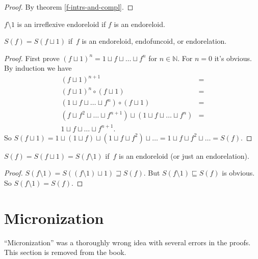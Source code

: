 \begin{proof}
By theorem \ref{f-intrs-and-compl}.
\end{proof}

\begin{obvious}
$f \setminus 1$ is an irreflexive endoreloid if $f$ is an endoreloid.
\end{obvious}

\begin{prop}
$S (f) = S (f \sqcup 1)$ if~$f$ is an endoreloid,
endofuncoid, or endorelation.
\end{prop}

\begin{proof}
First prove $(f \sqcup 1)^n = 1 \sqcup f \sqcup \ldots \sqcup f^n$ for $n \in
\mathbb{N}$. For $n = 0$ it's obvious. By induction we have
\begin{align*}
(f\sqcup 1)^{n+1} &= \\
(f\sqcup 1)^n\circ(f\sqcup 1) &= \\
(1\sqcup f\sqcup\dots\sqcup f^n)\circ(f\sqcup 1) &= \\
(f\sqcup f^2\sqcup\dots\sqcup f^{n+1}) \sqcup (1\sqcup f\sqcup\dots\sqcup f^n) &= \\
1\sqcup f\sqcup\dots\sqcup f^{n+1}.
\end{align*}
So $S (f \sqcup 1) = 1 \sqcup (1 \sqcup f) \sqcup (1 \sqcup f \sqcup f^2) \sqcup
\ldots = 1 \sqcup f \sqcup f^2 \sqcup \ldots = S (f)$.
\end{proof}

\begin{cor}
$S (f) = S (f \sqcup 1) = S (f \setminus 1)$ if~$f$ is an endoreloid
(or just an endorelation).
\end{cor}

\begin{proof}
$S (f \setminus 1) = S ((f \setminus 1) \sqcup 1) \sqsupseteq S (f)$. But $S
(f \setminus 1) \sqsubseteq S (f)$ is obvious. So $S (f \setminus 1) = S (f)$.
\end{proof}

\section{Micronization}

``Micronization'' was a thoroughly wrong idea with several errors in
the proofs. This section is removed from the book.
